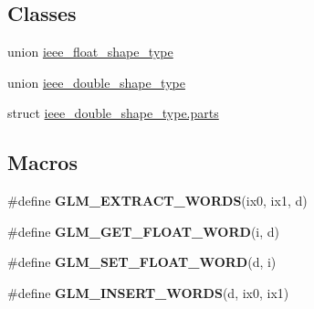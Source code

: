 \subsection*{Classes}
\begin{DoxyCompactItemize}
\item 
union \hyperlink{ulp_8inl_d0/d20/unionieee__float__shape__type}{ieee\+\_\+float\+\_\+shape\+\_\+type}
\item 
union \hyperlink{ulp_8inl_dd/d7f/unionieee__double__shape__type}{ieee\+\_\+double\+\_\+shape\+\_\+type}
\item 
struct \hyperlink{ulp_8inl_d3/d26/structieee__double__shape__type_8parts}{ieee\+\_\+double\+\_\+shape\+\_\+type.\+parts}
\end{DoxyCompactItemize}
\subsection*{Macros}
\begin{DoxyCompactItemize}
\item 
\#define {\bfseries G\+L\+M\+\_\+\+E\+X\+T\+R\+A\+C\+T\+\_\+\+W\+O\+R\+DS}(ix0,  ix1,  d)
\item 
\#define {\bfseries G\+L\+M\+\_\+\+G\+E\+T\+\_\+\+F\+L\+O\+A\+T\+\_\+\+W\+O\+RD}(i,  d)
\item 
\#define {\bfseries G\+L\+M\+\_\+\+S\+E\+T\+\_\+\+F\+L\+O\+A\+T\+\_\+\+W\+O\+RD}(d,  i)
\item 
\#define {\bfseries G\+L\+M\+\_\+\+I\+N\+S\+E\+R\+T\+\_\+\+W\+O\+R\+DS}(d,  ix0,  ix1)
\end{DoxyCompactItemize}
